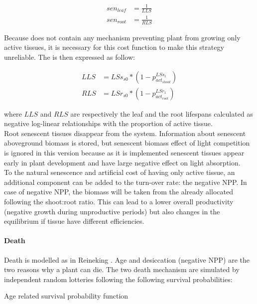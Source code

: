 \begin{align}
sen_{leaf} &= \frac{1}{LLS}\\
sen_{root} &= \frac{1}{RLS}
\end{align}

Because \model does not contain any mechanism preventing plant from growing only  active tissues, it is necessary for this cost function to make this strategy unreliable. The is then expressed as follow:

\begin{align}
LLS &= LSs_{s0} * (1- p_{act_{shoot}}^{LSs_{1}}) \\
RLS &= LSr_{s0} * (1- p_{act_{root}}^{LSr_{1}})
\end{align}


where $LLS$ and $RLS$ are respectively the leaf and the root lifespans calculated as negative log-linear relationships with the proportion of active tissue.\\
\indent Root senescent tissues disappear from the system. Information about senescent aboveground biomass is stored, but senescent biomass effect of light competition is ignored in this version because as it is implemented senescent tissues appear early in plant development and have large negative effect on light absorption.\\
\indent To the natural senescence and artificial cost of having only active tissue, an additional component can be added to the turn-over rate: the negative NPP. In case of negative NPP, the biomass will be taken from the already allocated following the shoot:root ratio. This can lead to a lower overall productivity (negative growth during unproductive periods) but also changes in the equilibrium if tissue have different efficiencies.\\

\paragraph{Death} Death is modelled as in Reineking \parencite{reineking_environmental_2006}. Age and desiccation (negative NPP) are the two reasons why a plant can die. The two death mechanism are simulated by independent random lotteries following the following survival probabilities:

\begin{marginfigure}[-4pt]
\label{fig:derivaives}
\caption{Age related survival probability function}
\end{marginfigure}

